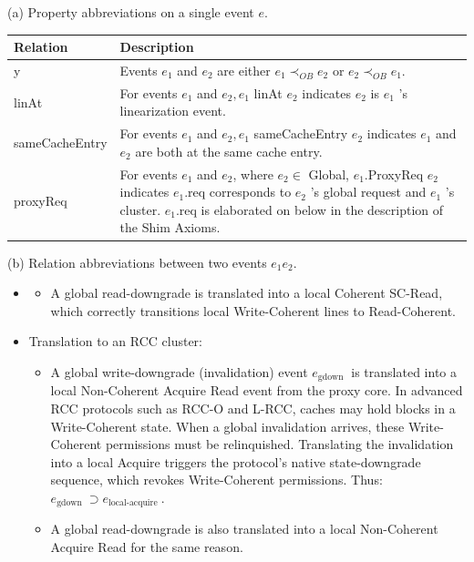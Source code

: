 \documentclass[10pt]{article}
\begin{document}
(a) Property abbreviations on a single event $e$.

\begin{center}
\begin{tabular}[t]{|l|l|}
\hline
Relation & Description \\
\hline
y & Events $e_{1}$ and $e_{2}$ are either $e_{1} \prec_{O B} e_{2}$ or $e_{2} \prec_{O B} e_{1}$. \\
\hline
linAt & For events $e_{1}$ and $e_{2}, e_{1}$ linAt $e_{2}$ indicates $e_{2}$ is $e_{1}$ 's linearization event. \\
\hline
sameCacheEntry & For events $e_{1}$ and $e_{2}, e_{1}$ sameCacheEntry $e_{2}$ indicates $e_{1}$ and $e_{2}$ are both at the same cache entry. \\
\hline
proxyReq & For events $e_{1}$ and $e_{2}$, where $e_{2} \in$ Global, $e_{1}$.ProxyReq $e_{2}$ indicates $e_{1}$.req corresponds to $e_{2}$ 's global request and $e_{1}$ 's cluster. $e_{1}$.req is elaborated on below in the description of the Shim Axioms. \\
\hline
\end{tabular}
\end{center}

(b) Relation abbreviations between two events $e_{1} e_{2}$.

\begin{itemize}
  \item[]
  \begin{itemize}
    \item[-] A global read-downgrade is translated into a local Coherent SC-Read, which correctly transitions local Write-Coherent lines to Read-Coherent.
  \end{itemize}
  \item[-] Translation to an RCC cluster:
  \begin{itemize}
    \item[-] A global write-downgrade (invalidation) event $e_{\text {gdown }}$ is translated into a local Non-Coherent Acquire Read event from the proxy core. In advanced RCC protocols such as RCC-O and L-RCC, caches may hold blocks in a Write-Coherent state. When a global invalidation arrives, these Write-Coherent permissions must be relinquished. Translating the invalidation into a local Acquire triggers the protocol's native state-downgrade sequence, which revokes Write-Coherent permissions. Thus: $e_{\text {gdown }} \supset e_{\text {local-acquire }}$.
    \item[-] A global read-downgrade is also translated into a local Non-Coherent Acquire Read for the same reason.
  \end{itemize}
\end{itemize}
\end{document}
